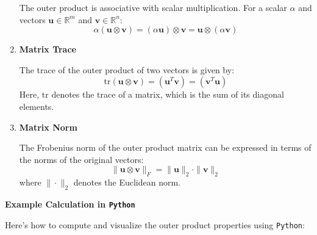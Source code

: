 \documentclass[
  letterpaper,
  DIV=11,
  numbers=noendperiod]{scrreprt}
\theoremstyle{plain}
\theoremstyle{definition}
\theoremstyle{remark}
\begin{document}
\begin{tcolorbox}
\begin{enumerate}
  The outer product is associative with scalar multiplication. For a
  scalar \(\alpha\) and vectors \(\mathbf{u} \in \mathbb{R}^m\) and
  \(\mathbf{v} \in \mathbb{R}^n\):
  \[\alpha (\mathbf{u} \otimes \mathbf{v}) = (\alpha \mathbf{u}) \otimes \mathbf{v} = \mathbf{u} \otimes (\alpha \mathbf{v})\]
\item
  \textbf{Matrix Trace}

  The trace of the outer product of two vectors is given by:
  \[\text{tr}(\mathbf{u} \otimes \mathbf{v}) = (\mathbf{u}^T \mathbf{v})= (\mathbf{v}^T \mathbf{u})\]
  Here, \(\text{tr}\) denotes the trace of a matrix, which is the sum of
  its diagonal elements.
\item
  \textbf{Matrix Norm}

  The Frobenius norm of the outer product matrix can be expressed in
  terms of the norms of the original vectors:
  \[\| \mathbf{u} \otimes \mathbf{v} \|_F = \| \mathbf{u} \|_2 \cdot \| \mathbf{v} \|_2\]
  where \(\| \cdot \|_2\) denotes the Euclidean norm.
\end{enumerate}

\end{tcolorbox}

\textbf{Example Calculation in \texttt{Python}}

Here's how to compute and visualize the outer product properties using
\texttt{Python}:
\end{document}
